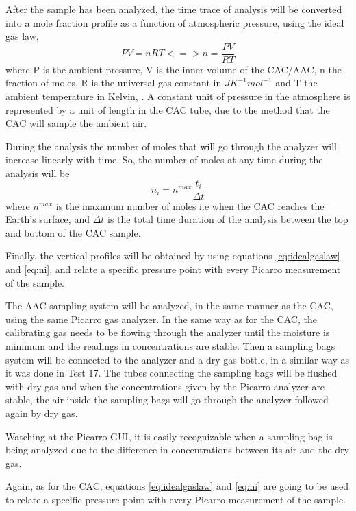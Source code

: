 After the sample has been analyzed, the time trace of analysis will be converted into a mole fraction profile as a function of atmospheric pressure, using the ideal gas law,
\begin{equation}
    PV = nRT <=> n = \frac{PV}{RT}
    \label{eq:idealgaslaw}
\end{equation}
where P is the ambient pressure, V is the inner volume of the CAC/AAC, n the fraction of moles, R is the universal gas constant in $J K^{-1} mol^{-1}$ and T the ambient temperature in Kelvin, \cite{Membrive}. 
A constant unit of pressure in the atmosphere is represented by a unit of length in the CAC tube, due to the method that the CAC will sample the ambient air.

During the analysis the number of moles that will go through the analyzer will increase linearly with time. So, the number of moles at any time during the analysis will be
\begin{equation}
    n_i = n^{max}\frac{t_i}{\Delta t}
    \label{eq:ni}
\end{equation}
where $n^{max}$ is the maximum number of moles i.e when the CAC reaches the Earth's surface, and $\Delta t$ is the total time duration of the analysis between the top and bottom of the CAC sample.   

Finally, the vertical profiles will be obtained by using equations \ref{eq:idealgaslaw} and \ref{eq:ni}, and relate a specific pressure point with every Picarro measurement of the sample.   

The AAC sampling system will be analyzed, in the same manner as the CAC, using the same Picarro gas analyzer. In the same way as for the CAC, the calibrating gas needs to be flowing through the analyzer until the moisture is minimum and the readings in concentrations are stable. Then a sampling bags system will be connected to the analyzer and a dry gas bottle, in a similar way as it was done in Test 17. The tubes connecting the sampling bags will be flushed with dry gas and when the concentrations given by the Picarro analyzer are stable, the air inside the sampling bags will go through the analyzer followed again by dry gas.  

Watching at the Picarro GUI, it is easily recognizable when a sampling bag is being analyzed due to the difference in concentrations between its air and the dry gas. 

Again, as for the CAC, equations \ref{eq:idealgaslaw} and \ref{eq:ni} are going to be used to relate a specific pressure point with every Picarro measurement of the sample. 


